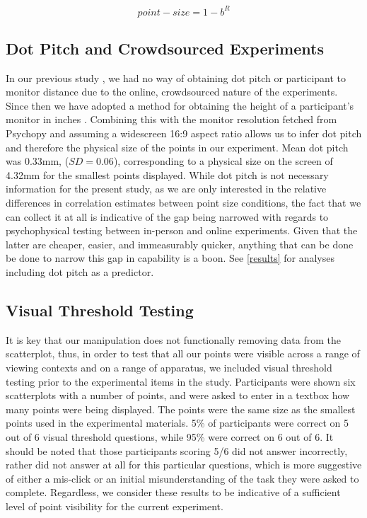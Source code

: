 \documentclass{vgtc}                          %
\begin{document}
\begin{equation}
  point-size = 1 - b^R
\end{equation}

\hypertarget{dot-pitch-and-crowdsourced-experiments-1}{%
\subsection{Dot Pitch and Crowdsourced Experiments}\label{dot-pitch-and-crowdsourced-experiments-1}}

In our previous study \cite{strain_2023}, we had no way of obtaining dot pitch
or participant to monitor distance due to the online, crowdsourced nature of the
experiments. Since then we have adopted a method for obtaining the height of a
participant's monitor in inches \cite{screenscale}. Combining this with the
monitor resolution fetched from Psychopy and assuming a widescreen 16:9 aspect ratio
allows us to infer dot pitch and therefore the physical size of the points in our
experiment. Mean dot pitch was 0.33mm, (\(SD = 0.06\)),
corresponding to a physical size on the screen of 4.32mm
for the smallest points displayed. While dot pitch is not necessary information for the present study, as we are only
interested in the relative differences in correlation estimates between point size
conditions, the fact that we can collect it at all is indicative of the gap
being narrowed with regards to psychophysical testing between in-person and online
experiments. Given that the latter are cheaper, easier, and immeasurably quicker,
anything that can be done be done to narrow this gap in capability is a boon.
See \autoref{results} for analyses including dot pitch as a predictor.

\hypertarget{visual-threshold-testing}{%
\subsection{Visual Threshold Testing}\label{visual-threshold-testing}}

It is key that our manipulation does not functionally removing data from the scatterplot,
thus, in order to test that all our points were visible across a range of viewing
contexts and on a range of apparatus, we included visual threshold testing prior
to the experimental items in the study. Participants were shown six scatterplots
with a number of points, and were asked to enter in a textbox how many points
were being displayed. The points were the same size as the smallest points used
in the experimental materials. 5\% of
participants were correct on 5 out of 6 visual
threshold questions, while 95\% were correct
on 6 out of 6. It should be noted that those
participants scoring 5/6 did not answer incorrectly, rather did not answer
at all for this particular questions, which is more suggestive of either
a mis-click or an initial misunderstanding of the task they were asked to complete.
Regardless, we consider these results to be indicative of a sufficient level of
point visibility for the current experiment.
\end{document}
